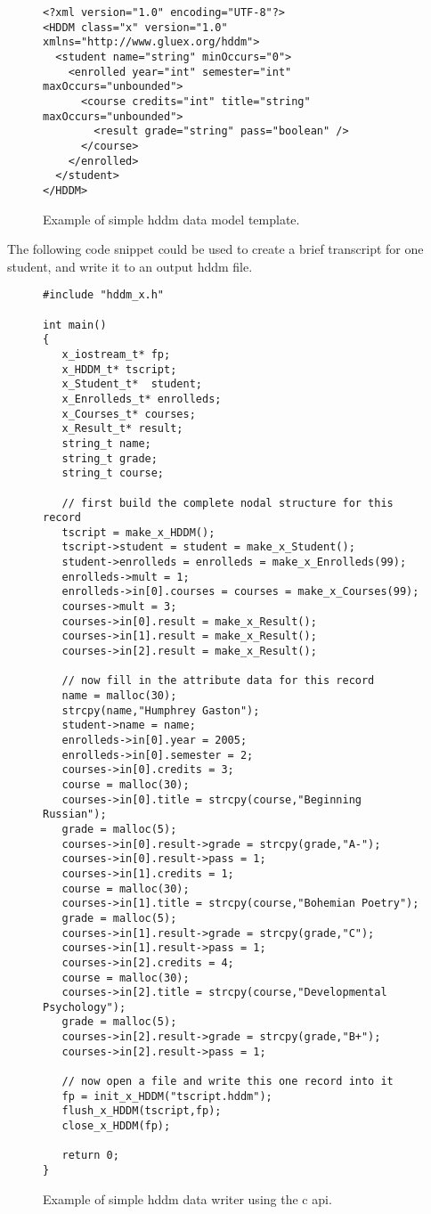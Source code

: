 \documentclass{revtex4}
\begin{document}
\begin{figure}
\begin{minipage}{12cm}
\begin{verbatim}
<?xml version="1.0" encoding="UTF-8"?>
<HDDM class="x" version="1.0" xmlns="http://www.gluex.org/hddm">
  <student name="string" minOccurs="0">
    <enrolled year="int" semester="int" maxOccurs="unbounded">
      <course credits="int" title="string" maxOccurs="unbounded">
        <result grade="string" pass="boolean" />
      </course>
    </enrolled>
  </student>
</HDDM>
\end{verbatim}
\end{minipage}
\caption{\label{template_ex1}
Example of simple hddm data model template.
}
\end{figure}

The following code snippet could be used to create a brief
transcript for one student, and write it to an output hddm file.

\begin{figure}
\begin{minipage}{12cm}
\begin{verbatim}
#include "hddm_x.h"

int main()
{
   x_iostream_t* fp;
   x_HDDM_t* tscript;
   x_Student_t*  student;
   x_Enrolleds_t* enrolleds;
   x_Courses_t* courses;
   x_Result_t* result;
   string_t name;
   string_t grade;
   string_t course;

   // first build the complete nodal structure for this record
   tscript = make_x_HDDM();
   tscript->student = student = make_x_Student();
   student->enrolleds = enrolleds = make_x_Enrolleds(99);
   enrolleds->mult = 1;
   enrolleds->in[0].courses = courses = make_x_Courses(99);
   courses->mult = 3;
   courses->in[0].result = make_x_Result();
   courses->in[1].result = make_x_Result();
   courses->in[2].result = make_x_Result();

   // now fill in the attribute data for this record
   name = malloc(30);
   strcpy(name,"Humphrey Gaston");
   student->name = name;
   enrolleds->in[0].year = 2005;
   enrolleds->in[0].semester = 2;
   courses->in[0].credits = 3;
   course = malloc(30);
   courses->in[0].title = strcpy(course,"Beginning Russian");
   grade = malloc(5);
   courses->in[0].result->grade = strcpy(grade,"A-");
   courses->in[0].result->pass = 1;
   courses->in[1].credits = 1;
   course = malloc(30);
   courses->in[1].title = strcpy(course,"Bohemian Poetry");
   grade = malloc(5);
   courses->in[1].result->grade = strcpy(grade,"C");
   courses->in[1].result->pass = 1;
   courses->in[2].credits = 4;
   course = malloc(30);
   courses->in[2].title = strcpy(course,"Developmental Psychology");
   grade = malloc(5);
   courses->in[2].result->grade = strcpy(grade,"B+");
   courses->in[2].result->pass = 1;

   // now open a file and write this one record into it
   fp = init_x_HDDM("tscript.hddm");
   flush_x_HDDM(tscript,fp);
   close_x_HDDM(fp);

   return 0;
}
\end{verbatim}
\end{minipage}
\caption{\label{maker_ex1}
Example of simple hddm data writer using the c api.
}
\end{figure}
\end{document}
